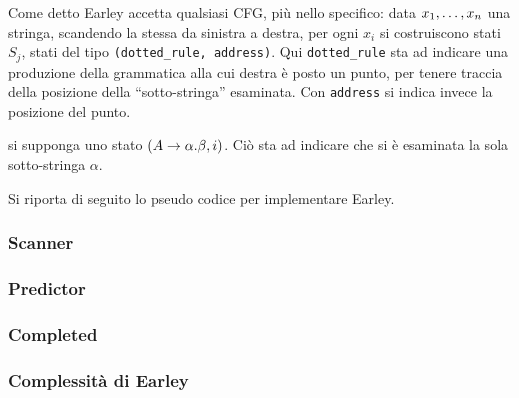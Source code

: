\documentclass{subfiles}
\begin{document}
Come detto Earley accetta qualsiasi CFG, più nello specifico: data ${x}_{1}, \ldots, {x}_{n}$ una stringa,
scandendo la stessa da sinistra a destra, per ogni $x_{i}$ si costruiscono stati $S_{j}$, stati del tipo \lstinline{(dotted_rule, address)}.
Qui \lstinline{dotted_rule} sta ad indicare una produzione della grammatica alla cui destra è posto un punto,
per tenere traccia della posizione della ``sotto-stringa'' esaminata. Con \lstinline{address} si indica invece la posizione del punto.

\begin{Example*}
    si supponga uno stato $(\Grammar{A}{\alpha . \beta}, i)$. Ciò sta ad indicare che si è esaminata la sola sotto-stringa $\alpha$.
\end{Example*}

\noindent Si riporta di seguito lo pseudo codice per implementare Earley.


\subsubsection{Scanner}


\subsubsection{Predictor}


\subsubsection{Completed}


\subsubsection{Complessità di Earley}

\end{document}
